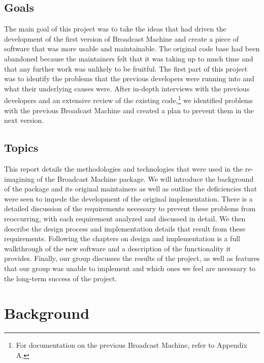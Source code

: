\documentclass[a4paper,12pt]{report}
\begin{document}
\section{Goals}
The main goal of this project was to take the ideas that had driven the development of the first version of Broadcast Machine and create a piece of software that was more usable and maintainable.
The original code base had been abandoned because the maintainers felt that it was taking up to much time and that any further work was unlikely to be fruitful.
The first part of this project was to identify the problems that the previous developers were running into and what their underlying causes were.
After in-depth interviews with the previous developers and an extensive review of the existing code,\footnote{For documentation on the previous Broadcast Machine, refer to Appendix A.} we identified problems with the previous Broadcast Machine and created a plan to prevent them in the next version.

\section{Topics}
This report details the methodologies and technologies that were used in the re-imagining of the Broadcast Machine package.
We will introduce the background of the package and its original maintainers as well as outline the deficiencies that were seen to impede the development of the original implementation.
There is a detailed discussion of the requirements necessary to prevent these problems from reoccurring, with each requirement analyzed and discussed in detail.
We then describe the design process and implementation details that result from these requirements.
Following the chapters on design and implementation is a full walkthrough of the new software and a description of the functionality it provides.
Finally, our group discusses the results of the project, as well as features that our group was unable to implement and which ones we feel are necessary to the long-term success of the project.

\chapter{Background}
\end{document}
